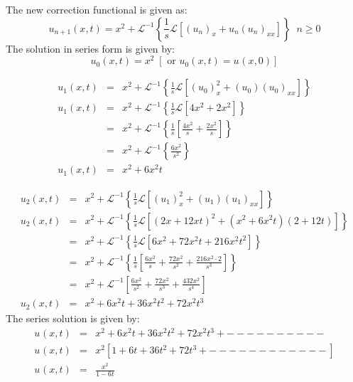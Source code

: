 \documentclass[12pt]{report}
\newcommand{\Laplace}{\mathcal{L}}
\newcommand{\sbracket}[1]{\left[#1\right]}
\newcommand{\Un}[2]{u_{#1}(#2)}
\newcommand{\NI}{\noindent}
\newcommand{\InverseL}[1]{\Laplace^{-1}\left[#1\right]}
\newcommand{\LT}[1]{\Laplace \left[#1\right]}
\newcommand{\Unx}[1]{\Un{#1}{x,t}}
\newcommand{\InverseLx}[1]{\Laplace^{-1}\left\{ #1 \right\}}
\begin{document}
\NI The new correction functional is given as:
\begin{equation}
	\Unx{n+1} = x^2 + \InverseLx{\frac{1}{s}\LT{(u_n)_x + u_{n}(u_n)_{xx}}} \; \; n \geq 0
\end{equation}
The solution in series form is given by:\\[0.2cm]
\begin{equation}
	\Un{0}{x,t} = x^2 \; \sbracket{\text{ or } \Unx{0} = \Un{}{x,0}}
\end{equation}

\begin{eqnarray}
\Unx{1} &=& x^2 + \InverseLx{\frac{1}{s}\LT{\left(u_{0}\right)_{x}^{2} + \left(u_{0}\right)\left(u_{0}\right)_{xx}}} \nonumber   \\[0.1cm]
\Unx{1} &=& x^2 + \InverseLx{\frac{1}{s}\LT{4x^2 + 2x^2}}\nonumber \\[0.1cm]
&=& x^2 + \InverseLx{\frac{1}{s}\left[\frac{4x^2}{s} + \frac{2x^2}{s}\right]}\nonumber \\[0.1cm]
&=& x^2 + \InverseLx{\frac{6x^2}{s^2}}\nonumber \\[0.3cm]
\Unx{1} &=& x^2 + 6x^{2}t
\end{eqnarray}

\begin{eqnarray}
\Unx{2} &=& x^2 + \InverseLx{\frac{1}{s}\LT{\left(u_{1}\right)_{x}^{2} + \left(u_{1}\right)\left(u_{1}\right)_{xx}}}\nonumber    \\[0.1cm]
\Unx{2} &=& x^2 + \InverseLx{\frac{1}{s}\LT{(2x + 12xt)^2 + (x^2 + 6x^{2}t)(2+12t)}} \nonumber\\[0.1cm]
&=& x^2 + \InverseLx{\frac{1}{s}\LT{6x^2 + 72x^2t + 216x^2t^2}} \nonumber\\[0.1cm]
&=& x^2 + \InverseLx{\frac{1}{s}\left[\frac{6x^2}{s} + \frac{72x^2}{s^2} + \frac{216x^2 \cdot 2}{s^3} \right]}\nonumber \\
&=& x^2 + \InverseL{\frac{6x^2}{s^2} + \frac{72x^2}{s^3} + \frac{432x^2}{s^4}}\nonumber\\[0.3cm]
\Unx{2} &=& x^2 + 6x^2t + 36x^2t^2 + 72x^2t^3
\end{eqnarray}
The series solution is given by:
\begin{eqnarray*}
\Unx{} &=& x^2 + 6x^2t + 36x^2t^2 + 72x^2t^3 + - - - - - - - - - -\\[0.25cm]
\Unx{} &=& x^2\left[1+6t + 36t^2 + 72t^3 + - - - - - - - - - - - -  \right] \\[0.27cm]
\Unx{} &=& \frac{x^2}{1-6t}\\
\label{eq:}
\end{eqnarray*}
\end{document}
